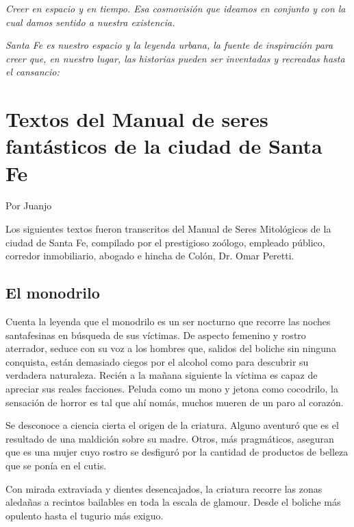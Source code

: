 \documentclass[11pt,twoside,openright,a5paper]{book}
\begin{document}
\vspace{0.5cm}
\emph{Creer en espacio y en tiempo. Esa cosmovisión que ideamos en conjunto y con la cual damos sentido a nuestra existencia.}

\emph{Santa Fe es nuestro espacio y la leyenda urbana, la fuente de inspiración para creer que, en nuestro lugar, las historias pueden ser inventadas y recreadas hasta el cansancio:}

\section*{Textos del Manual de seres fantásticos de la ciudad de Santa Fe}

                         \begin{flushright}Por Juanjo\end{flushright}

Los siguientes textos fueron transcritos del Manual de Seres Mitológicos de la ciudad de Santa Fe, compilado por el prestigioso zoólogo, empleado público, corredor inmobiliario, abogado e hincha de Colón, Dr. Omar Peretti.

\subsection*{El monodrilo}

Cuenta la leyenda que el monodrilo es un ser nocturno que recorre las noches santafesinas en búsqueda de sus víctimas. De aspecto femenino y rostro aterrador, seduce con su voz a los hombres que, salidos del boliche sin ninguna conquista, están demasiado ciegos por el alcohol como para descubrir su verdadera naturaleza. Recién a la mañana siguiente la víctima es capaz de apreciar sus reales facciones. Peluda como un mono y jetona como cocodrilo, la sensación de horror es tal que ahí nomás, muchos mueren de un paro al corazón.

Se desconoce a ciencia cierta el origen de la criatura. Alguno aventuró que es el resultado de una maldición sobre su madre. Otros, más pragmáticos, aseguran que es una mujer cuyo rostro se desfiguró por la cantidad de productos de belleza que se ponía en el cutis.

Con mirada extraviada y dientes desencajados, la criatura recorre las zonas aledañas a recintos bailables en toda la escala de glamour. Desde el boliche más opulento hasta el tugurio más exiguo.
\end{document}

